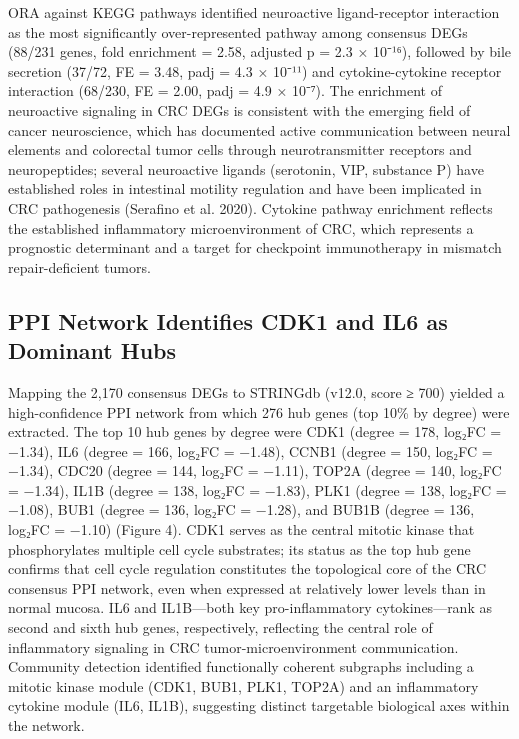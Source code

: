 \documentclass[
  12pt,
]{article}
\begin{document}
ORA against KEGG pathways identified neuroactive ligand-receptor
interaction as the most significantly over-represented pathway among
consensus DEGs (88/231 genes, fold enrichment = 2.58, adjusted p = 2.3 ×
10⁻¹⁶), followed by bile secretion (37/72, FE = 3.48, padj = 4.3 ×
10⁻¹¹) and cytokine-cytokine receptor interaction (68/230, FE = 2.00,
padj = 4.9 × 10⁻⁷). The enrichment of neuroactive signaling in CRC DEGs
is consistent with the emerging field of cancer neuroscience, which has
documented active communication between neural elements and colorectal
tumor cells through neurotransmitter receptors and neuropeptides;
several neuroactive ligands (serotonin, VIP, substance P) have
established roles in intestinal motility regulation and have been
implicated in CRC pathogenesis (Serafino et al. 2020). Cytokine pathway
enrichment reflects the established inflammatory microenvironment of
CRC, which represents a prognostic determinant and a target for
checkpoint immunotherapy in mismatch repair-deficient tumors.

\subsection{PPI Network Identifies CDK1 and IL6 as Dominant
Hubs}\label{ppi-network-identifies-cdk1-and-il6-as-dominant-hubs}

Mapping the 2,170 consensus DEGs to STRINGdb (v12.0, score ≥ 700)
yielded a high-confidence PPI network from which 276 hub genes (top 10\%
by degree) were extracted. The top 10 hub genes by degree were CDK1
(degree = 178, log₂FC = −1.34), IL6 (degree = 166, log₂FC = −1.48),
CCNB1 (degree = 150, log₂FC = −1.34), CDC20 (degree = 144, log₂FC =
−1.11), TOP2A (degree = 140, log₂FC = −1.34), IL1B (degree = 138, log₂FC
= −1.83), PLK1 (degree = 138, log₂FC = −1.08), BUB1 (degree = 136,
log₂FC = −1.28), and BUB1B (degree = 136, log₂FC = −1.10) (Figure 4).
CDK1 serves as the central mitotic kinase that phosphorylates multiple
cell cycle substrates; its status as the top hub gene confirms that cell
cycle regulation constitutes the topological core of the CRC consensus
PPI network, even when expressed at relatively lower levels than in
normal mucosa. IL6 and IL1B---both key pro-inflammatory cytokines---rank
as second and sixth hub genes, respectively, reflecting the central role
of inflammatory signaling in CRC tumor-microenvironment communication.
Community detection identified functionally coherent subgraphs including
a mitotic kinase module (CDK1, BUB1, PLK1, TOP2A) and an inflammatory
cytokine module (IL6, IL1B), suggesting distinct targetable biological
axes within the network.
\end{document}
